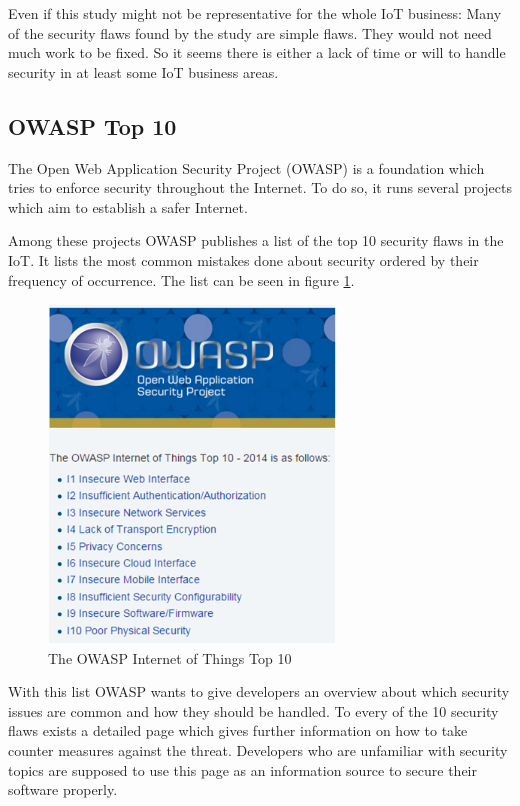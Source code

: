 \documentclass[conference]{IEEEtran}
\begin{document}
Even if this study might not be representative for the whole IoT business: Many 
of the security flaws found by the study are simple flaws. They would not need 
much work to be fixed. So it seems there is either a lack of time or will to 
handle security in at least some IoT business areas.

\subsection{OWASP Top 10}
The Open Web Application Security Project (OWASP) is a foundation which tries 
to enforce security throughout the Internet. To do so, it runs several projects 
which aim to establish a safer Internet. 

Among these projects OWASP publishes a list of the top 10 security flaws in the 
IoT. It lists the most common mistakes done about security ordered by their 
frequency of occurrence. The list can be seen in figure \ref{owaspTop10}. 

\begin{figure}[!t]
\centering
\includegraphics[width=3.0in]{./img/owaspTop10.png}
\caption{The OWASP Internet of Things Top 10}
\label{owaspTop10}
\end{figure}

With this list OWASP wants to give developers an overview about which security 
issues are common and how they should be handled. To every of the 10 security 
flaws exists a detailed page which gives further information on how to take 
counter measures against the threat. Developers who are unfamiliar with  
security topics are supposed to use this page as an information source to 
secure their software properly.
\end{document}
